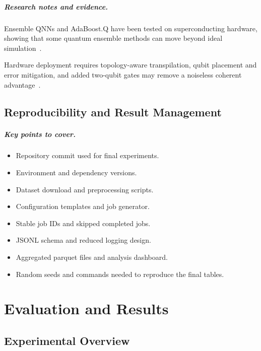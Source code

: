 \documentclass[]{UCD_CS_MSc_AAI_Report}
\newcommand{\challenge}[1]{{\color{red}#1}}
\newcommand{\validation}[1]{{\color{yellow!60!olive}#1}}
\newcommand{\sectionbrief}{\paragraph{Key points to cover.}}
\newcommand{\researchnotes}{\paragraph{Research notes and evidence.}}
\begin{document}
\researchnotes
\begin{itemize}
    \validation{\item Ensemble QNNs and AdaBoost.Q have been tested on superconducting hardware, showing that some quantum ensemble methods can move beyond ideal simulation~\cite{incudini_resource_2023,song_quantum_2024}.}
    \challenge{\item Hardware deployment requires topology-aware transpilation, qubit placement and error mitigation, and added two-qubit gates may remove a noiseless coherent advantage~\cite{rathi_enhanced_2025}.}
\end{itemize}

\section{Reproducibility and Result Management}
\label{sec:method-reproducibility}

\sectionbrief
\begin{itemize}
    \item Repository commit used for final experiments.
    \item Environment and dependency versions.
    \item Dataset download and preprocessing scripts.
    \item Configuration templates and job generator.
    \item Stable job IDs and skipped completed jobs.
    \item JSONL schema and reduced logging design.
    \item Aggregated parquet files and analysis dashboard.
    \item Random seeds and commands needed to reproduce the final tables.
\end{itemize}

\chapter{Evaluation and Results}
\label{chap:results}

\section{Experimental Overview}
\label{sec:results-overview}
\end{document}
